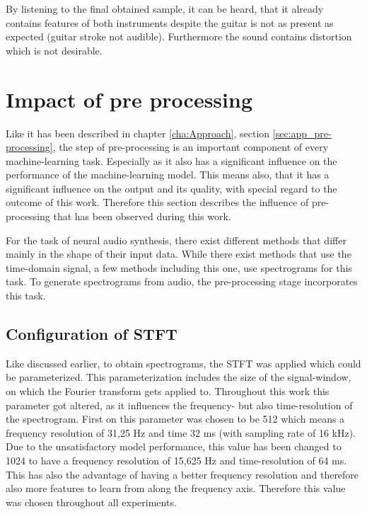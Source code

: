 By listening to the final obtained sample, it can be heard, that it already contains features of both instruments despite the guitar is not as present as expected (guitar stroke not audible). Furthermore the sound contains distortion which is not desirable.

\section{Impact of pre processing}
\label{sec:disc_imp_pre_processing}

Like it has been described in chapter \ref{cha:Approach}, section \ref{sec:app_pre-processing}, the step of pre-processing is an important component of every machine-learning task. Especially as it also has a significant influence on the performance of the machine-learning model. This means also, that it has a significant influence on the output and its quality, with special regard to the outcome of this work. Therefore this section describes the influence of pre-processing that has been observed during this work. 

For the task of neural audio synthesis, there exist different methods that differ mainly in the shape of their input data. While there exist methods that use the time-domain signal, a few methods including this one, use spectrograms for this task. To generate spectrograms from audio, the pre-processing stage incorporates this task. 

\subsection{Configuration of STFT}
Like discussed earlier, to obtain spectrograms, the STFT was applied which could be parameterized. This parameterization includes the size of the signal-window, on which the Fourier transform gets applied to. Throughout this work this parameter got altered, as it influences the frequency- but also time-resolution of the spectrogram. First on this parameter was chosen to be 512 which means a frequency resolution of 31,25 Hz and time 32 ms (with sampling rate of 16 kHz). Due to the unsatisfactory model performance, this value has been changed to 1024 to have a frequency resolution of 15,625 Hz and time-resolution of 64 ms. This has also the advantage of having a better frequency resolution and therefore also more features to learn from along the frequency axis. Therefore this value was chosen throughout all experiments.

